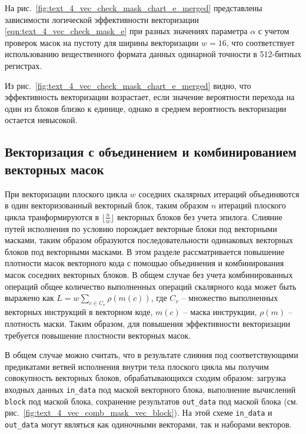 На рис.~\ref{fig:text_4_vec_check_mask_chart_e_merged} представлены зависимости логической эффективности векторизации \eqref{eqn:text_4_vec_check_mask_e} при разных значениях параметра $\alpha$ с учетом проверок масок на пустоту для ширины векторизации $w = 16$, что соответствует использованию вещественного формата данных одинарной точности в 512-битных регистрах.

Из рис.~\ref{fig:text_4_vec_check_mask_chart_e_merged} видно, что эффективность векторизации возрастает, если значение вероятности перехода на один из блоков близко к единице, однако в среднем вероятность векторизации остается невысокой.


\subsection{Векторизация с объединением и комбинированием векторных масок}\label{sec:text_4_comb_mask}

При векторизации плоского цикла $w$ соседних скалярных итераций объединяются в один векторизованный векторный блок, таким образом $n$ итераций плоского цикла транформируются в $\lfloor \frac{n}{w} \rfloor$ векторных блоков без учета эпилога.
Слияние путей исполнения по условию порождает векторные блоки под векторными масками, таким образом образуются последовательности одинаковых векторных блоков под векторными масками.
В этом разделе рассматривается повышение плотности масок векторного кода с помощью объединения и комбинирования масок соседних векторных блоков.
В общем случае без учета комбинированных операций общее количество выполненных операций скалярного кода может быть выражено как $L = w \sum_{c \in C_v}{\rho(m(c))}$, где $C_v$ -- множество выполненных векторных инструкций в векторном коде, $m(c)$ -- маска инструкции, $\rho(m)$ -- плотность маски.
Таким образом, для повышения эффективности векторизации требуется повышение плостности векторных масок.

В общем случае можно считать, что в результате слияния под соответствующими предикатами ветвей исполнения внутри тела плоского цикла мы получим совокупность векторных блоков, обрабатывающихся сходим образом: загрузка входных данных \texttt{in\_data} под маской векторного блока, выполнение вычислений \texttt{block} под маской блока, сохранение результатов \texttt{out\_data} под маской блока (см. рис.~\ref{fig:text_4_vec_comb_mask_vec_block}).
На этой схеме \texttt{in\_data} и \texttt{out\_data} могут являться как одиночными векторами, так и наборами векторов.

